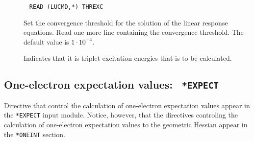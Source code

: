 \begin{description}
\item[]\verb| |\newline
\verb|READ (LUCMD,*) THREXC|

Set the convergence threshold for the solution
of the linear response equations. Read one more line
containing the convergence threshold. The default value is
$1\cdot10^{-4}$.

\item[]
Indicates that it is triplet excitation energies that is to be
calculated.
\end{description}

\subsection{One-electron expectation values: {\tt
*EXPECT}}\label{sec:expect}

Directive that control the calculation of one-electron expectation
values appear in the \verb|*EXPECT| input module. Notice, however,
that the directives controling the calculation of one-electron
expectation values to the geometric Hessian appear in the
\verb|*ONEINT| section.

